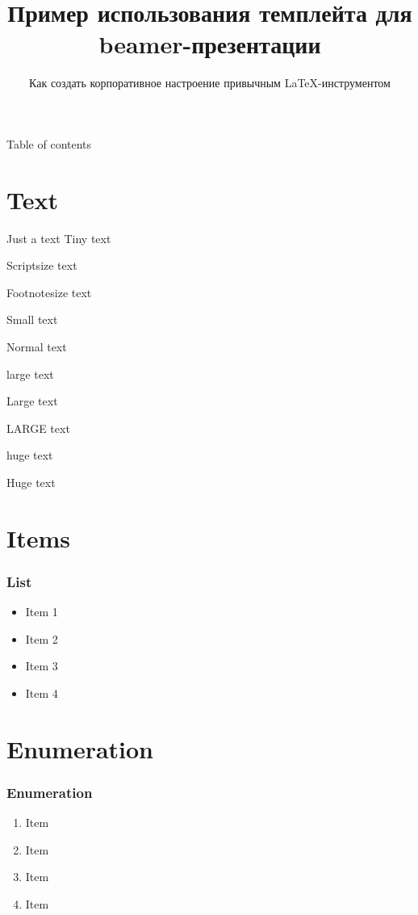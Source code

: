 
\title[bash]{Пример использования темплейта для beamer-презентации}
\subtitle{Как создать корпоративное настроение привычным \LaTeX-инструментом}



\begin{frame}
	\titlepage
\end{frame}

\begin{frame}{Table of contents}
	\tableofcontents
\end{frame}




\section{Text}
\begin{frame}{Just a text}
    \tiny Tiny text

    \scriptsize Scriptsize text

    \footnotesize Footnotesize text

    \small Small text

    \normalsize Normal text

    \large large text

    \Large Large text

    \LARGE LARGE text

    \huge huge text

    \Huge Huge text

\end{frame}

\section{Items}
\begin{frame}
    \frametitle{List}

    \begin{itemize}
	\item Item 1
	\item Item 2
	\item Item 3
	\item Item 4
    \end{itemize}
\end{frame}

\section{Enumeration}
\begin{frame}
    \frametitle{Enumeration}

    \begin{enumerate}
	\item Item
	\item Item
	\item Item
	\item Item
    \end{enumerate}
\end{frame}

